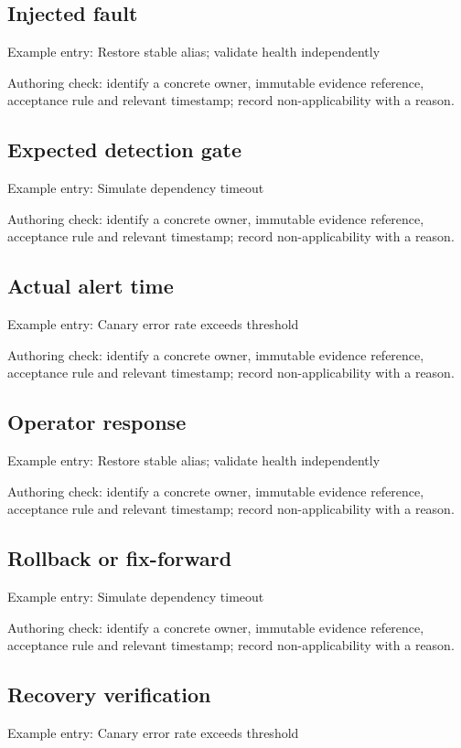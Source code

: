 \documentclass[10pt,letterpaper]{article}
\begin{document}
\subsection{Injected fault}
Example entry: Restore stable alias; validate health independently

Authoring check: identify a concrete owner, immutable evidence reference, acceptance rule and relevant timestamp; record non-applicability with a reason.


\subsection{Expected detection gate}
Example entry: Simulate dependency timeout

Authoring check: identify a concrete owner, immutable evidence reference, acceptance rule and relevant timestamp; record non-applicability with a reason.


\subsection{Actual alert time}
Example entry: Canary error rate exceeds threshold

Authoring check: identify a concrete owner, immutable evidence reference, acceptance rule and relevant timestamp; record non-applicability with a reason.


\subsection{Operator response}
Example entry: Restore stable alias; validate health independently

Authoring check: identify a concrete owner, immutable evidence reference, acceptance rule and relevant timestamp; record non-applicability with a reason.


\subsection{Rollback or fix-forward}
Example entry: Simulate dependency timeout

Authoring check: identify a concrete owner, immutable evidence reference, acceptance rule and relevant timestamp; record non-applicability with a reason.


\subsection{Recovery verification}
Example entry: Canary error rate exceeds threshold
\end{document}
